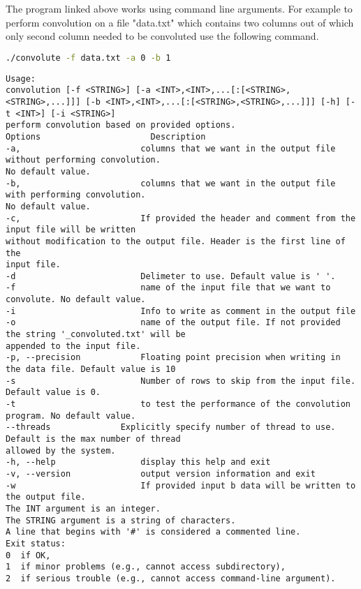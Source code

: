 The program linked above works using command line arguments. For example to perform convolution on a file "data.txt" which contains two columns out of which only second column needed to be convoluted use the following command.

\begin{lstlisting}[language=bash]
./convolute -f data.txt -a 0 -b 1
\end{lstlisting}

\begin{lstlisting}[style=Instruction]
Usage:
convolution [-f <STRING>] [-a <INT>,<INT>,...[:[<STRING>,<STRING>,...]]] [-b <INT>,<INT>,...[:[<STRING>,<STRING>,...]]] [-h] [-t <INT>] [-i <STRING>]
perform convolution based on provided options.
Options                      Description
-a,                        columns that we want in the output file without performing convolution.
No default value.
-b,                        columns that we want in the output file with performing convolution.
No default value.
-c,                        If provided the header and comment from the input file will be written
without modification to the output file. Header is the first line of the
input file.
-d                         Delimeter to use. Default value is ' '.
-f                         name of the input file that we want to convolute. No default value.
-i                         Info to write as comment in the output file
-o                         name of the output file. If not provided the string '_convoluted.txt' will be
appended to the input file.
-p, --precision            Floating point precision when writing in the data file. Default value is 10
-s                         Number of rows to skip from the input file. Default value is 0.
-t                         to test the performance of the convolution program. No default value.
--threads              Explicitly specify number of thread to use. Default is the max number of thread
allowed by the system.
-h, --help                 display this help and exit
-v, --version              output version information and exit
-w                         If provided input b data will be written to the output file.
The INT argument is an integer.
The STRING argument is a string of characters.
A line that begins with '#' is considered a commented line.
Exit status:
0  if OK,
1  if minor problems (e.g., cannot access subdirectory),
2  if serious trouble (e.g., cannot access command-line argument).
\end{lstlisting}
